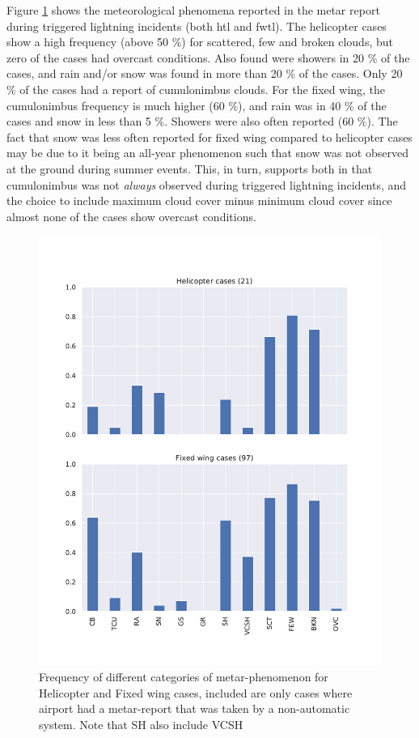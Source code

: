 Figure \ref{fig:metarcases} shows the meteorological phenomena reported in the \acrshort{metar} report during triggered lightning incidents (both \acrshort{htl} and \acrshort{fwtl}). The helicopter cases show a high frequency (above 50 $\%$) for scattered, few and broken clouds, but zero of the cases had overcast conditions. Also found were showers in 20 $\%$ of the cases, and rain and/or snow was found in more than 20 $\%$ of the cases. Only 20 $\%$ of the cases had a report of cumulonimbus clouds. For the fixed wing, the cumulonimbus frequency is much higher (60 $\%$), and rain was in 40 $\%$ of the cases and snow in less than 5 $\%$. Showers were also often reported (60 $\%$). The fact that snow was less often reported for fixed wing compared to helicopter cases may be due to it being an all-year phenomenon such that snow was not observed at the ground during summer events. This, in turn, supports both \cite{lande1999} in that cumulonimbus was not \textit{always} observed during triggered lightning incidents, and the choice to include maximum cloud cover minus minimum cloud cover since almost none of the cases show overcast conditions.

\begin{figure}[H]
    \centering
    \includegraphics[width=\textwidth]{Figures/METARcases.pdf}
    \caption{Frequency of different categories of \acrshort{metar}-phenomenon for Helicopter and Fixed wing cases, included are only cases where airport had a \acrshort{metar}-report that was taken by a non-automatic system. Note that SH also include VCSH}
    \label{fig:metarcases}
\end{figure}

